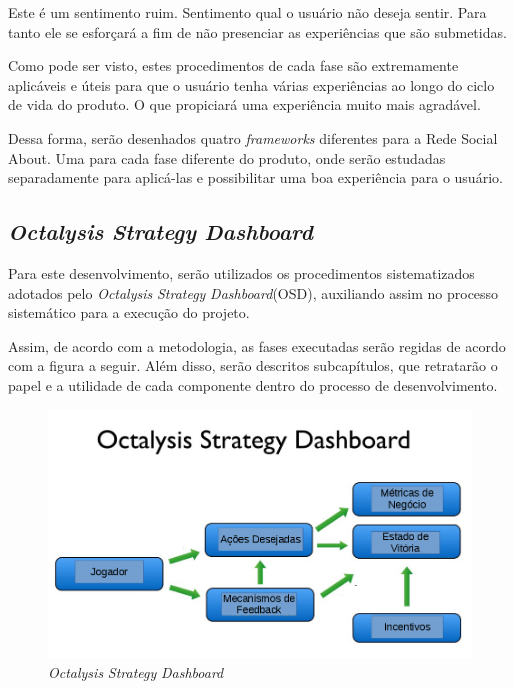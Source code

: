 Este é um sentimento ruim. Sentimento qual o usuário não deseja sentir. Para tanto
ele se esforçará a fim de não presenciar as experiências que são submetidas.

Como pode ser visto, estes procedimentos de cada fase são extremamente aplicáveis
e úteis para que o usuário tenha várias experiências ao longo do ciclo de vida do
produto. O que propiciará uma experiência muito mais agradável.

Dessa forma, serão desenhados quatro \textit{frameworks} diferentes para a Rede Social About.
Uma para cada fase diferente do produto, onde serão estudadas separadamente para
aplicá-las e possibilitar uma boa experiência para o usuário.

\subsection{\textit{Octalysis} \textit{Strategy} \textit{Dashboard}}
\label{sec:octalysisdashborad}
Para este desenvolvimento, serão utilizados os procedimentos sistematizados adotados
pelo \textit{Octalysis} \textit{Strategy} \textit{Dashboard}(OSD), auxiliando assim no processo sistemático para
a execução do projeto. 

Assim, de acordo com a metodologia, as fases executadas serão regidas de acordo com a
figura a seguir.  Além disso, serão descritos subcapítulos, que retratarão o papel e a 
utilidade de cada componente dentro do processo de desenvolvimento.


 \begin{figure}[h]
     \centering

     \includegraphics[width=450px, scale=1]{figuras/dashboard}
     \caption{\textit{Octalysis} \textit{Strategy} \textit{Dashboard}}

     \label{fig:dashboard}
 \end{figure}


